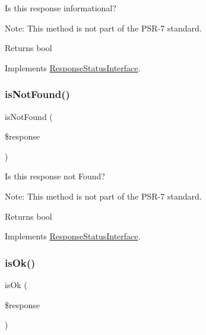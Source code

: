 Is this response informational?

Note\+: This method is not part of the P\+S\+R-\/7 standard.

\begin{DoxyReturn}{Returns}
bool 
\end{DoxyReturn}


Implements \mbox{\hyperlink{interface_pes_1_1_http_1_1_response_status_interface_aefe91e716fcd58aed7eea5eade4b7cc0}{Response\+Status\+Interface}}.

\mbox{\label{class_pes_1_1_http_1_1_response_status_aef4db1f3ebf7e7ddcf51de3af3471713}} 
\subsubsection{\texorpdfstring{is\+Not\+Found()}{isNotFound()}}
{\footnotesize\ttfamily is\+Not\+Found (\begin{DoxyParamCaption}\item[{Response\+Interface}]{\$response }\end{DoxyParamCaption})}

Is this response not Found?

Note\+: This method is not part of the P\+S\+R-\/7 standard.

\begin{DoxyReturn}{Returns}
bool 
\end{DoxyReturn}


Implements \mbox{\hyperlink{interface_pes_1_1_http_1_1_response_status_interface_aef4db1f3ebf7e7ddcf51de3af3471713}{Response\+Status\+Interface}}.

\mbox{\label{class_pes_1_1_http_1_1_response_status_ab3105c65ed8a2617a4928f250dba979f}} 
\subsubsection{\texorpdfstring{is\+Ok()}{isOk()}}
{\footnotesize\ttfamily is\+Ok (\begin{DoxyParamCaption}\item[{Response\+Interface}]{\$response }\end{DoxyParamCaption})}

